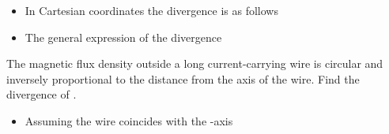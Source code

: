 \begin{ELjoin}

\begin{itemize}
\tightlist
\item
  In Cartesian coordinates the divergence is as follows
\end{itemize}

\begin{ELimportant}{}


\end{ELimportant}

\end{ELjoin}

\begin{ELjoin}

\begin{itemize}
\tightlist
\item
  The general expression of the divergence
\end{itemize}

\begin{ELimportant}{}


\end{ELimportant}

\end{ELjoin}


\begin{ELexample}{}

The magnetic flux density  outside a long current-carrying wire is circular and inversely proportional to the distance from the axis of the wire. Find the divergence of .

\begin{ELsolution}

\begin{itemize}
\tightlist
\item
  Assuming the wire coincides with the -axis
\end{itemize}



\end{ELsolution}

\end{ELexample}

